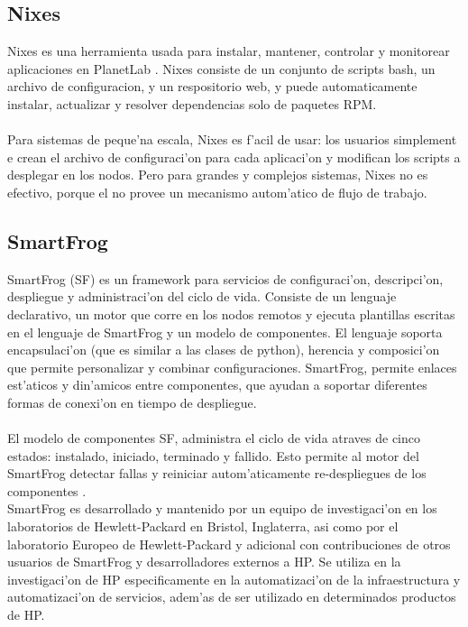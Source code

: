 \subsection{Nixes}
Nixes es una herramienta usada para instalar, mantener, controlar y monitorear aplicaciones en PlanetLab \cite{Nixes13}. Nixes consiste de un conjunto de scripts bash, un archivo de configuracion, y un respositorio web, y puede automaticamente instalar, actualizar y resolver dependencias solo de paquetes RPM.\\
\\
Para sistemas de peque'na escala, Nixes es f'acil de usar: los usuarios simplement e crean el archivo de configuraci'on para cada aplicaci'on y modifican los scripts a desplegar en los nodos. Pero para grandes y complejos sistemas, Nixes no es efectivo, porque el no provee un mecanismo autom'atico de flujo de trabajo.

\subsection{SmartFrog}
SmartFrog (SF) es un framework para servicios de configuraci'on, descripci'on, despliegue y administraci'on del ciclo de vida. Consiste de un lenguaje declarativo, un motor que corre en los nodos remotos y ejecuta plantillas escritas en el lenguaje de SmartFrog y un modelo de componentes. El lenguaje soporta encapsulaci'on (que es similar a las clases de python), herencia y composici'on que permite personalizar y combinar configuraciones. SmartFrog, permite enlaces est'aticos y din'amicos entre componentes, que ayudan a soportar diferentes formas de conexi'on en tiempo de despliegue.\\
\\
El modelo de componentes SF, administra el ciclo de vida atraves de cinco estados: instalado, iniciado, terminado y fallido. Esto permite al motor del SmartFrog detectar fallas y reiniciar autom'aticamente re-despliegues de los componentes \cite{Smart09}.
\\
SmartFrog es desarrollado y mantenido por un equipo de investigaci'on en los laboratorios de Hewlett-Packard en Bristol, Inglaterra, asi como por el laboratorio Europeo de Hewlett-Packard y adicional con contribuciones de otros usuarios de SmartFrog y desarrolladores externos a HP. Se utiliza en la investigaci'on de HP especificamente en la automatizaci'on de la infraestructura y automatizaci'on de servicios, adem'as de ser utilizado en determinados productos de HP.

